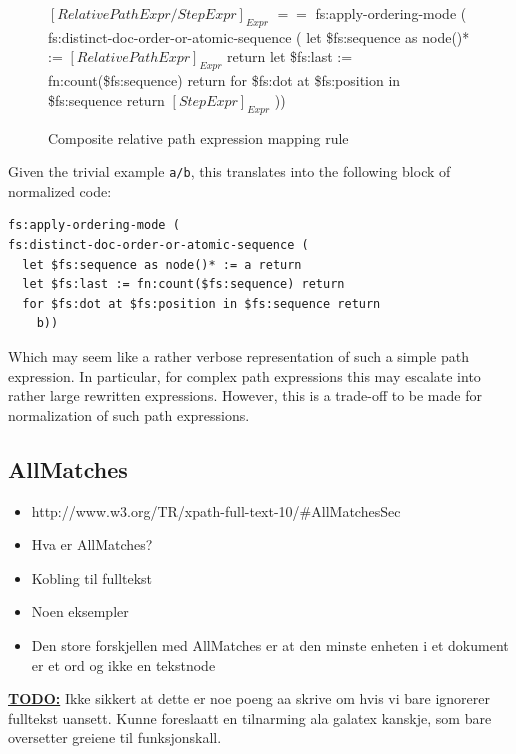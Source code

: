 \begin{figure}[!h]
\centering
$[RelativePathExpr / StepExpr]_{Expr}$ \newline
$==$ \newline
fs:apply-ordering-mode ( \newline
fs:distinct-doc-order-or-atomic-sequence ( \newline
    let \$fs:sequence as node()* := $[RelativePathExpr]_{Expr}$ return \newline
    let \$fs:last := fn:count(\$fs:sequence) return \newline
    for \$fs:dot at \$fs:position in \$fs:sequence return \newline
       $[StepExpr]_{Expr}$
))
  \caption{Composite relative path expression mapping rule}
  \label{figure:xquery:relpath_mapping_rule}
\end{figure}

Given the trivial example \verb!a/b!, this translates into the following block
of normalized code:

\begin{verbatim}
fs:apply-ordering-mode (
fs:distinct-doc-order-or-atomic-sequence (
  let $fs:sequence as node()* := a return
  let $fs:last := fn:count($fs:sequence) return
  for $fs:dot at $fs:position in $fs:sequence return
    b))
\end{verbatim}

Which may seem like a rather verbose representation of such a simple path
expression. In particular, for complex path expressions this may
escalate into rather large rewritten expressions. However, this is a trade-off
to be made for normalization of such path expressions.

\subsection{AllMatches}
\label{sect:theory:xquery:allmatches}
\begin{itemize}
  \item http://www.w3.org/TR/xpath-full-text-10/\#AllMatchesSec
  \item Hva er AllMatches?
  \item Kobling til fulltekst
  \item Noen eksempler
  \item Den store forskjellen med AllMatches er at den minste enheten i et 
        dokument er et ord og ikke en tekstnode
\end{itemize}
\textbf{\underline{\LARGE TODO:}} Ikke sikkert at dette er noe poeng aa skrive
om hvis vi bare ignorerer fulltekst uansett. Kunne foreslaatt en tilnarming ala galatex kanskje, som bare
oversetter greiene til funksjonskall.
